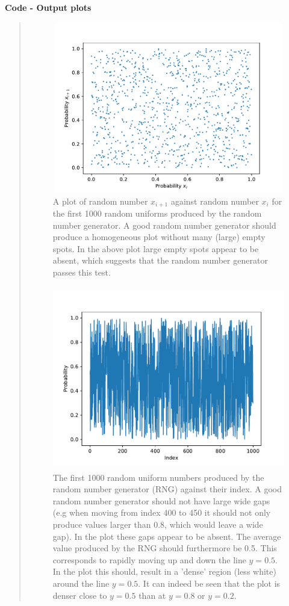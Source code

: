 \textbf{Code - Output plots}
\begin{quote}

\begin{figure}[!ht]
\centering
\includegraphics[width=12cm, height=7.5cm]{./Plots/1_plot_against.pdf}
\caption{A plot of random number $x_{i+1}$ against random number  $x_{i}$ for the first 1000 random uniforms produced by the random number generator. A good random number generator should produce a homogeneous plot without many (large) empty spots. In the above plot large empty spots appear to be absent, which suggests that the random number generator passes this test. }
\end{figure}

\begin{figure}[!hb]
\centering
\includegraphics[width=12cm, height=8.0cm]{./Plots/1_plot_index.pdf}
\caption{The first 1000 random uniform numbers produced by the random number generator (RNG) against their index. A good random number generator should not have large wide gaps  (e.g when moving from index 400 to 450 it should not only produce values larger than 0.8, which would leave a wide gap). In the plot these gaps appear to be absent. The average value produced by the RNG should furthermore be 0.5. This corresponds to rapidly moving up and down  the line $ y = 0.5$. In the plot this should, result in a 'dense' region (less white) around the line $y = 0.5$. It can indeed be seen that the plot is denser close to $y = 0.5$ than at $y=0.8$ or $y=0.2$. }
\end{figure}


\end{quote}
